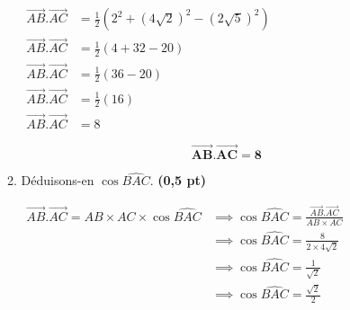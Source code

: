 \documentclass[12pt,a4paper]{article}
\begin{document}
\begin{enumerate}
\begin{enumerate}
                    \(
                    \begin{aligned}
                        \overrightarrow{AB}.\overrightarrow{AC} & =\frac{1}{2}\left( 2^{2}+(4\sqrt{2})^{2}-(2\sqrt{5})^{2}\right) \\
                        \overrightarrow{AB}.\overrightarrow{AC} & =\frac{1}{2}\left( 4+32-20\right)                               \\
                        \overrightarrow{AB}.\overrightarrow{AC} & =\frac{1}{2}\left( 36-20\right)                                 \\
                        \overrightarrow{AB}.\overrightarrow{AC} & =\frac{1}{2}\left( 16\right)                                    \\
                        \overrightarrow{AB}.\overrightarrow{AC} & =8
                    \end{aligned}
                    \)

                    \begin{resultbox}
                        \[
                            \mathbf{\overrightarrow{AB}.\overrightarrow{AC}=8}
                        \]
                    \end{resultbox}

              \item Déduisons-en \( \cos \widehat{BAC} \). \hfill \textbf{(0,5 pt)}

                    \(
                    \begin{aligned}
                        \overrightarrow{AB}.\overrightarrow{AC}= AB\times AC \times \cos \widehat{BAC} & \implies \cos \widehat{BAC}=\frac{\overrightarrow{AB}.\overrightarrow{AC}}{AB\times AC} \\
                                                                                                       & \implies \cos \widehat{BAC}=\frac{8}{2\times 4\sqrt{2}}                                 \\
                                                                                                       & \implies \cos \widehat{BAC}=\frac{1}{\sqrt{2}}                                          \\
                                                                                                       & \implies \cos \widehat{BAC}=\frac{\sqrt{2}}{2}                                          \\
                    \end{aligned}
                    \)


\end{enumerate}
\end{enumerate}
\end{document}
